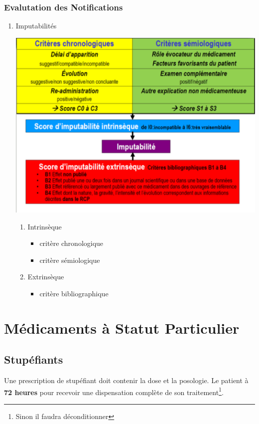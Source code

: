 \documentclass[11pt]{article}
\begin{document}
\subsubsection{Evalutation des Notifications}
\label{sec:org6d77f33}
\begin{enumerate}
\item Imputabilités
\label{sec:org509e655}
\begin{center}
\includegraphics[width=.9\linewidth]{./imputabilite.png}
\end{center}
\begin{enumerate}
\item Intrinsèque
\label{sec:orgef5801e}
\begin{itemize}
\item critère chronologique
\item critère sémiologique
\end{itemize}
\item Extrinsèque
\label{sec:org38a4ede}
\begin{itemize}
\item critère bibliographique
\end{itemize}
\end{enumerate}
\end{enumerate}
\section{Médicaments à Statut Particulier}
\label{sec:org6f00486}
\setlength{\parindent}{0pt}

\subsection{Stupéfiants}
\label{sec:org73183aa}
Une prescription de stupéfiant doit contenir la dose et la posologie.
Le patient à \textbf{72 heures} pour recevoir une dispensation complète de son traitement\footnote{Sinon il faudra déconditionner}.
\end{document}
